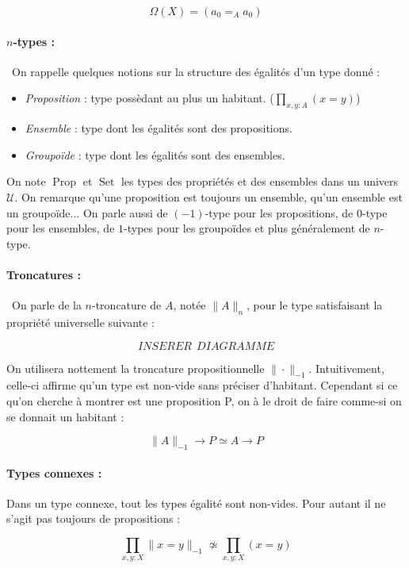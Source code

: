\documentclass{article}
\DeclareMathOperator{\set}{Set}
\DeclareMathOperator{\prop}{Prop}
\begin{document}
\[\Omega(X) = (a_0 =_{A} a_0)\]

\paragraph{$n$-types :} On rappelle quelques notions sur la structure des égalités d'un type donné :

\begin{itemize}
  \item \emph{Proposition} : type possèdant au plus un habitant. ($\prod_{x,y : A} (x = y) $)
  \item \emph{Ensemble} : type dont les égalités sont des propositions.
  \item \emph{Groupoïde} : type dont les égalités sont des ensembles.
\end{itemize}

On note $\prop$ et $\set$ les types des propriétés et des ensembles dans un univers $\mathcal{U}$. On remarque qu'une proposition est toujours un ensemble, qu'un ensemble est un groupoïde... On parle aussi de $(-1)$-type pour les propositions, de $0$-type pour les ensembles, de $1$-types pour les groupoïdes et plus généralement de $n$-type.

\paragraph{Troncatures :} On parle de la $n$-troncature de $A$, notée $\|A\|_{n}$, pour le type satisfaisant la propriété universelle suivante :

\begin{equation*}
 INSERER \ \ DIAGRAMME
\end{equation*}

On utilisera nottement la troncature propositionnelle $\|\cdot\|_{-1}$. Intuitivement, celle-ci affirme qu'un type est non-vide sans préciser d'habitant. Cependant si ce qu'on cherche à montrer est une proposition P, on à le droit de faire comme-si on se donnait un habitant :

\[ \|A\|_{-1} \to P \simeq A \to P\]

\paragraph{Types connexes :} Dans un type connexe, tout les types égalité sont non-vides. Pour autant il ne s'agit pas toujours de propositions :

\[\prod_{x,y : X} \|x = y\|_{-1} \not\simeq \prod_{x,y : X} (x = y)\]
\end{document}
